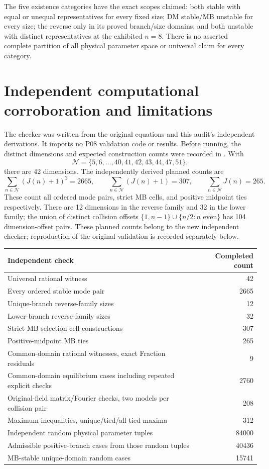 \documentclass[11pt]{article}
\begin{document}
The five existence categories have the exact scopes claimed:
both stable with equal or unequal representatives for every fixed size;
DM stable/MB unstable for every size; the reverse only in its proved
branch/size domains; and both unstable with distinct representatives
at the exhibited $n=8$. There is no asserted complete partition of
all physical parameter space or universal claim for every category.

\section{Independent computational corroboration and limitations}
The checker  was written from
the original equations and this audit's independent derivations. It
imports no P08 validation code or results. Before running, the distinct
dimensions and expected construction counts were recorded in
. With
\[
 \mathcal N=\{5,6,\ldots,40,41,42,43,44,47,51\},
\]
there are 42 dimensions. The independently derived planned counts are
\[
 \sum_{n\in\mathcal N}(J(n)+1)^2=2665,\qquad
 \sum_{n\in\mathcal N}(J(n)+1)=307,\qquad
 \sum_{n\in\mathcal N}J(n)=265.
\]
These count all ordered mode pairs, strict MB cells, and positive
midpoint ties respectively. There are 12 dimensions in the reverse
family and 32 in the lower family; the union of distinct collision
offsets $\{1,n-1\}\cup\{n/2:n\text{ even}\}$ has 104 dimension-offset
pairs. These planned counts belong to the new independent checker;
reproduction of the original validation is recorded separately below.

\begin{longtable}{@{}L{0.67\textwidth}r@{}}
\toprule Independent check & Completed count\\\midrule\endhead
Universal rational witness &42\\
Every ordered stable mode pair &2665\\
Unique-branch reverse-family sizes &12\\
Lower-branch reverse-family sizes &32\\
Strict MB selection-cell constructions &307\\
Positive-midpoint MB ties &265\\
Common-domain rational witnesses, exact Fraction residuals &9\\
Common-domain equilibrium cases including repeated explicit checks &2760\\
Original-field matrix/Fourier checks, two models per collision pair &208\\
Maximum inequalities, unique/tied/all-tied maxima &312\\
Independent random physical parameter tuples &84000\\
Admissible positive-branch cases from those random tuples &40436\\
MB-stable unique-domain random cases &15741\\
\bottomrule
\end{longtable}
\end{document}
